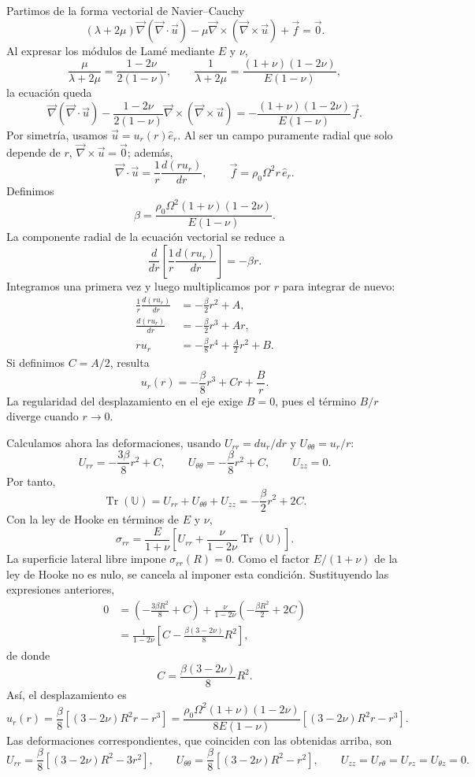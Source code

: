 \documentclass[a4paper]{article}
\begin{document}
Partimos de la forma vectorial de Navier--Cauchy
\[
(\lambda+2\mu)\vec\nabla(\vec\nabla\cdot\vec u)
-\mu\vec\nabla\times(\vec\nabla\times\vec u)
+\vec f=\vec 0.
\]
Al expresar los módulos de Lamé mediante $E$ y $\nu$,
\[
\frac{\mu}{\lambda+2\mu}
=\frac{1-2\nu}{2(1-\nu)},
\qquad
\frac{1}{\lambda+2\mu}
=\frac{(1+\nu)(1-2\nu)}{E(1-\nu)},
\]
la ecuación queda
\[
\vec\nabla(\vec\nabla\cdot\vec u)
-\frac{1-2\nu}{2(1-\nu)}
\vec\nabla\times(\vec\nabla\times\vec u)
=-\frac{(1+\nu)(1-2\nu)}{E(1-\nu)}\vec f.
\]
Por simetría, usamos $\vec u=u_r(r)\hat e_r$. Al ser un campo puramente radial que solo depende de $r$, $\vec\nabla\times\vec u=\vec 0$; además,
\[
\vec\nabla\cdot\vec u
=\frac{1}{r}\frac{d(ru_r)}{dr},
\qquad
\vec f=\rho_0\Omega^2r\,\hat e_r.
\]
Definimos
\[
\beta=\frac{\rho_0\Omega^2(1+\nu)(1-2\nu)}{E(1-\nu)}.
\]
La componente radial de la ecuación vectorial se reduce a
\[
\frac{d}{dr}\left[\frac{1}{r}\frac{d(ru_r)}{dr}\right]
=-\beta r.
\]
Integramos una primera vez y luego multiplicamos por $r$ para integrar de nuevo:
\[
\begin{aligned}
\frac{1}{r}\frac{d(ru_r)}{dr}
&=-\frac{\beta}{2}r^2+A,\\
\frac{d(ru_r)}{dr}
&=-\frac{\beta}{2}r^3+Ar,\\
ru_r&=-\frac{\beta}{8}r^4+\frac{A}{2}r^2+B.
\end{aligned}
\]
Si definimos $C=A/2$, resulta
\[
u_r(r)=-\frac{\beta}{8}r^3+Cr+\frac{B}{r}.
\]
La regularidad del desplazamiento en el eje exige $B=0$, pues el término $B/r$ diverge cuando $r\to0$.

Calculamos ahora las deformaciones, usando $U_{rr}=du_r/dr$ y $U_{\theta\theta}=u_r/r$:
\[
U_{rr}=-\frac{3\beta}{8}r^2+C,
\qquad
U_{\theta\theta}=-\frac{\beta}{8}r^2+C,
\qquad
U_{zz}=0.
\]
Por tanto,
\[
\operatorname{Tr}(\mathbb U)
=U_{rr}+U_{\theta\theta}+U_{zz}
=-\frac{\beta}{2}r^2+2C.
\]
Con la ley de Hooke en términos de $E$ y $\nu$,
\[
\sigma_{rr}
=\frac{E}{1+\nu}\left[
U_{rr}+\frac{\nu}{1-2\nu}\operatorname{Tr}(\mathbb U)
\right].
\]
La superficie lateral libre impone $\sigma_{rr}(R)=0$. Como el factor $E/(1+\nu)$ de la ley de Hooke no es nulo, se cancela al imponer esta condición. Sustituyendo las expresiones anteriores,
\[
\begin{aligned}
0
&=\left(-\frac{3\beta R^2}{8}+C\right)
+\frac{\nu}{1-2\nu}
\left(-\frac{\beta R^2}{2}+2C\right)\\
&=\frac{1}{1-2\nu}
\left[C-\frac{\beta(3-2\nu)}{8}R^2\right],
\end{aligned}
\]
de donde
\[
C=\frac{\beta(3-2\nu)}{8}R^2.
\]
Así, el desplazamiento es
\[
\boxed{
u_r(r)=\frac{\beta}{8}
\left[(3-2\nu)R^2r-r^3\right]
=\frac{\rho_0\Omega^2(1+\nu)(1-2\nu)}{8E(1-\nu)}
\left[(3-2\nu)R^2r-r^3\right].
}
\]
Las deformaciones correspondientes, que coinciden con las obtenidas arriba, son
\[
\boxed{U_{rr}=\frac{\beta}{8}\left[(3-2\nu)R^2-3r^2\right]},
\qquad
\boxed{U_{\theta\theta}=\frac{\beta}{8}
\left[(3-2\nu)R^2-r^2\right]},
\qquad
U_{zz}=U_{r\theta}=U_{rz}=U_{\theta z}=0.
\]
\end{document}
